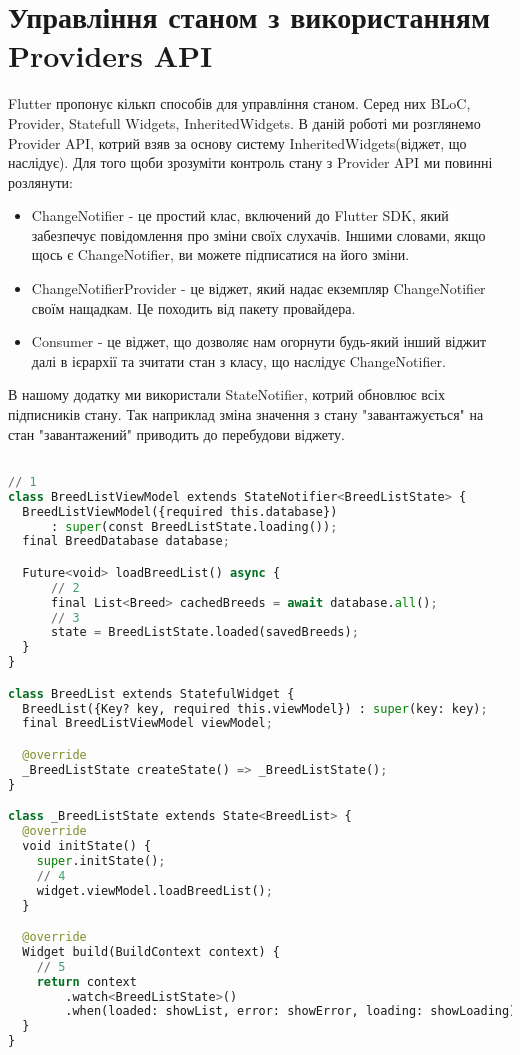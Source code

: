 \section{Управління станом з використанням Providers API}
\label{section.2.5}
Flutter пропонує кількп способів для управління станом. Серед них BLoC, Provider, Statefull Widgets, InheritedWidgets.
В даній роботі ми розглянемо Provider API, котрий взяв за основу систему InheritedWidgets(віджет, що наслідує).
Для того щоби зрозуміти контроль стану з Provider API ми повинні розлянути:

\begin{itemize}
    \item ChangeNotifier - це простий клас, включений до Flutter SDK, який забезпечує повідомлення про зміни своїх слухачів. Іншими словами, якщо щось є ChangeNotifier, ви можете підписатися на його зміни.
    \item ChangeNotifierProvider - це віджет, який надає екземпляр ChangeNotifier своїм нащадкам. Це походить від пакету провайдера.
    \item Consumer - це віджет, що дозволяє нам огорнути будь-який інший віджит далі в ієрархії та зчитати стан з класу, що наслідує ChangeNotifier.
\end{itemize}

В нашому додатку ми використали StateNotifier, котрий обновлює всіх підписників стану.
Так наприклад зміна значення з стану "завантажується" на стан "завантажений" приводить до перебудови віджету.

\begin{lstlisting}[style=light, language=Python,label={lst:flutter_sqflite},caption=Flutter SQFLITE]

// 1
class BreedListViewModel extends StateNotifier<BreedListState> {
  BreedListViewModel({required this.database})
      : super(const BreedListState.loading());
  final BreedDatabase database;

  Future<void> loadBreedList() async {
      // 2
      final List<Breed> cachedBreeds = await database.all();
      // 3
      state = BreedListState.loaded(savedBreeds);
  }
}

class BreedList extends StatefulWidget {
  BreedList({Key? key, required this.viewModel}) : super(key: key);
  final BreedListViewModel viewModel;

  @override
  _BreedListState createState() => _BreedListState();
}

class _BreedListState extends State<BreedList> {
  @override
  void initState() {
    super.initState();
    // 4
    widget.viewModel.loadBreedList();
  }

  @override
  Widget build(BuildContext context) {
    // 5
    return context
        .watch<BreedListState>()
        .when(loaded: showList, error: showError, loading: showLoading);
  }
}
\end{lstlisting}

